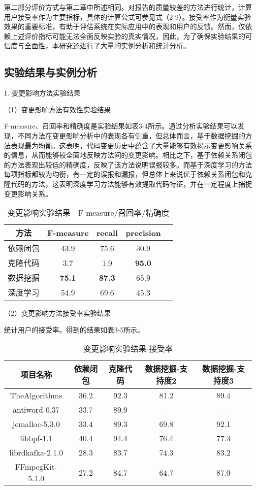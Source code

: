 第二部分评价方式与第二章中所述相同。对报告的质量较差的方法进行统计，计算用户接受率作为主要指标，具体的计算公式可参见式（2-9）。接受率作为衡量实验效果的重要标准，有助于评估系统在实际应用中的表现和用户的反馈。然而，仅依赖上述评价指标可能无法全面反映实验的真实情况，因此，为了确保实验结果的可信度与全面性，本研究还进行了大量的实例分析和统计分析。

\subsection{实验结果与实例分析}

1. 变更影响方法实验结果

（1）变更影响方法有效性实验结果

F-measure、召回率和精确度是实验结果如表3-4所示。通过分析实验结果可以发现，不同方法在变更影响分析中的表现各有侧重，但总体而言，基于数据挖掘的方法表现最为均衡。这表明，代码变更历史中蕴含了大量能够有效揭示变更影响关系的信息，从而能够较全面地反映方法间的变更影响。相比之下，基于依赖关系闭包的方法表现出较低的精确度，反映了该方法说明误报较多。而基于深度学习的方法每项指标都较为均衡，有一定的误报和漏报，但总体上来说优于依赖关系闭包和克隆代码的方法，这表明深度学习方法能够有效提取代码特征，并在一定程度上捕捉变更影响关系。

\begin{table}[htbp]
\caption{变更影响实验结果 - F-measure/召回率/精确度}
\vspace{0.5em}\centering\wuhao
\begin{tabular}{ccccc}
\toprule
方法 & F-measure & recall & precision  \\
\midrule
依赖闭包 & 43.9 & 75.6 & 30.9 \\
克隆代码 & 3.7 & 1.9 & \textbf{95.0} \\
数据挖掘 & \textbf{75.1} & \textbf{87.3} & 65.9\\
深度学习 & 54.9 & 69.6 & 45.3 \\
\bottomrule
\end{tabular}
\end{table}

（2）变更影响方法接受率实验结果

统计用户的接受率。得到的结果如表3-5所示。

\begin{table}[htbp]
\caption{变更影响实验结果-接受率}
\vspace{0.5em}\centering\wuhao
\begin{tabular}{ccccc}
\toprule
项目名称 & 依赖闭包 & 克隆代码 & 数据挖掘-支持度2 & 数据挖掘-支持度3 \\
\midrule
TheAlgorithms & 36.2 & 92.3 & 81.2 & 89.4\\
antiword-0.37 & 33.7 & 89.9 & - & -\\
jemalloc-5.3.0 & 33.4 & 89.3 & 69.8 & 92.1\\
libbpf-1.1 & 40.4 & 94.4 & 76.4 & 77.3\\
librdkafka-2.1.0 & 28.3 & 83.7 & 74.3 & 83.2\\
FFmpegKit-5.1.0 & 27.2 & 84.7 & 64.7 & 87.0\\

\bottomrule
\end{tabular}
\end{table}

